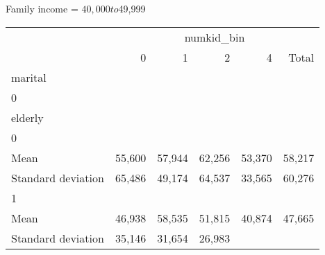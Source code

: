 Family income = $40,000 to $49,999
\begin{tabular}{llllll}
\cline{1-6}
\multicolumn{1}{c}{} &
  \multicolumn{5}{|c}{numkid\_bin} \\
\multicolumn{1}{c}{} &
  \multicolumn{1}{|r}{0} &
  \multicolumn{1}{r}{1} &
  \multicolumn{1}{r}{2} &
  \multicolumn{1}{r}{4} &
  \multicolumn{1}{r}{Total} \\
\cline{1-6}
\multicolumn{1}{l}{marital} &
  \multicolumn{1}{|r}{} &
  \multicolumn{1}{r}{} &
  \multicolumn{1}{r}{} &
  \multicolumn{1}{r}{} &
  \multicolumn{1}{r}{} \\
\multicolumn{1}{l}{\hspace{1em}0} &
  \multicolumn{1}{|r}{} &
  \multicolumn{1}{r}{} &
  \multicolumn{1}{r}{} &
  \multicolumn{1}{r}{} &
  \multicolumn{1}{r}{} \\
\multicolumn{1}{l}{\hspace{2em}elderly} &
  \multicolumn{1}{|r}{} &
  \multicolumn{1}{r}{} &
  \multicolumn{1}{r}{} &
  \multicolumn{1}{r}{} &
  \multicolumn{1}{r}{} \\
\multicolumn{1}{l}{\hspace{3em}0} &
  \multicolumn{1}{|r}{} &
  \multicolumn{1}{r}{} &
  \multicolumn{1}{r}{} &
  \multicolumn{1}{r}{} &
  \multicolumn{1}{r}{} \\
\multicolumn{1}{l}{\hspace{4em}Mean} &
  \multicolumn{1}{|r}{55,600} &
  \multicolumn{1}{r}{57,944} &
  \multicolumn{1}{r}{62,256} &
  \multicolumn{1}{r}{53,370} &
  \multicolumn{1}{r}{58,217} \\
\multicolumn{1}{l}{\hspace{4em}Standard deviation} &
  \multicolumn{1}{|r}{65,486} &
  \multicolumn{1}{r}{49,174} &
  \multicolumn{1}{r}{64,537} &
  \multicolumn{1}{r}{33,565} &
  \multicolumn{1}{r}{60,276} \\
\multicolumn{1}{l}{\hspace{3em}1} &
  \multicolumn{1}{|r}{} &
  \multicolumn{1}{r}{} &
  \multicolumn{1}{r}{} &
  \multicolumn{1}{r}{} &
  \multicolumn{1}{r}{} \\
\multicolumn{1}{l}{\hspace{4em}Mean} &
  \multicolumn{1}{|r}{46,938} &
  \multicolumn{1}{r}{58,535} &
  \multicolumn{1}{r}{51,815} &
  \multicolumn{1}{r}{40,874} &
  \multicolumn{1}{r}{47,665} \\
\multicolumn{1}{l}{\hspace{4em}Standard deviation} &
  \multicolumn{1}{|r}{35,146} &
  \multicolumn{1}{r}{31,654} &
  \multicolumn{1}{r}{26,983} &

\end{tabular}
